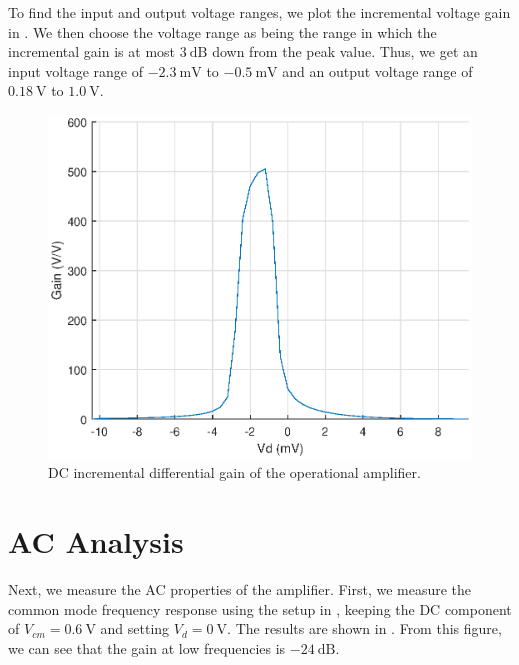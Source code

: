 \documentclass[journal,hidelinks]{IEEEtran}
\begin{document}
To find the input and output voltage ranges, we plot the incremental voltage gain in . We then choose the voltage range as being the range in which the incremental gain is at most $\SI{3}{\deci\bel}$ down from the peak value. Thus, we get an input voltage range of $\SI{-2.3}{\milli\volt}$ to $\SI{-0.5}{\milli\volt}$ and an output voltage range of $\SI{0.18}{\volt}$ to $\SI{1.0}{\volt}$.

\begin{figure}[!htb]
  \centering
  \includegraphics[width=\columnwidth]{dc_dm_gain.eps}
  \caption{DC incremental differential gain of the operational amplifier.}
  \label{fig:dc_dm_gain}
\end{figure}

\section{AC Analysis}

Next, we measure the AC properties of the amplifier. First, we measure the common mode frequency response using the setup in , keeping the DC component of $V_{cm} = \SI{0.6}{\volt}$ and setting $V_d = \SI{0}{\volt}$. The results are shown in . From this figure, we can see that the gain at low frequencies is $\SI{-24}{\deci\bel}$.
\end{document}
